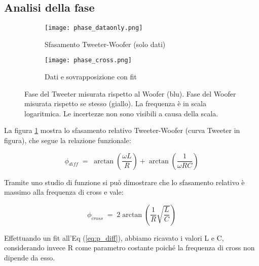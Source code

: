 \documentclass[../Relazione_circuiti]{subfiles}
\begin{document}
\subsection{Analisi della fase}

\begin{figure}[H]
\centering

\begin{subfigure}{=0.5\textwidth}
\centering
\texttt{[image: phase\_dataonly.png]}

\caption{Sfasamento Tweeter-Woofer (solo dati)}
\label{fig: pdiff_dataonly}

\end{subfigure}

\begin{subfigure}{=0.5\textwidth}
\centering
\texttt{[image: phase\_cross.png]}

\caption{Dati e sovrapposizione con fit}
\label{fig: pdiff_fit_data}

\end{subfigure}

\caption{Fase del Tweeter misurata rispetto al Woofer (blu). Fase del Woofer  misurata rispetto se stesso (giallo). La frequenza è in scala logaritmica. Le incertezze non sono visibili a causa della scala.}
\label{fig: phase_diff}

\end{figure}

La figura \ref{fig: pdiff_dataonly} mostra lo sfasamento relativo Tweeter-Woofer (curva Tweeter in figura), che segue la relazione funzionale:

  \begin{equation}
    \label{eq:p_diff}
    \phi_{diff} \; = \; \arctan(\frac{\omega L}{R}) + \arctan(\frac{1}{\omega RC})
  \end{equation}
  
Tramite uno studio di funzione si può dimostrare che lo sfasamento relativo è massimo alla frequenza di cross e vale:


 \begin{equation}
    \label{eq:p_diff_cross}
    \phi_{cross} \; = \; 2 \arctan(\frac{1}{R} \sqrt{\frac{L}{C}})
  \end{equation}

  
Effettuando un fit all'Eq (\ref{eq:p_diff}), abbiamo ricavato i valori L e C, considerando invece R come parametro costante poiché la frequenza di cross non dipende da esso.
\end{document}

